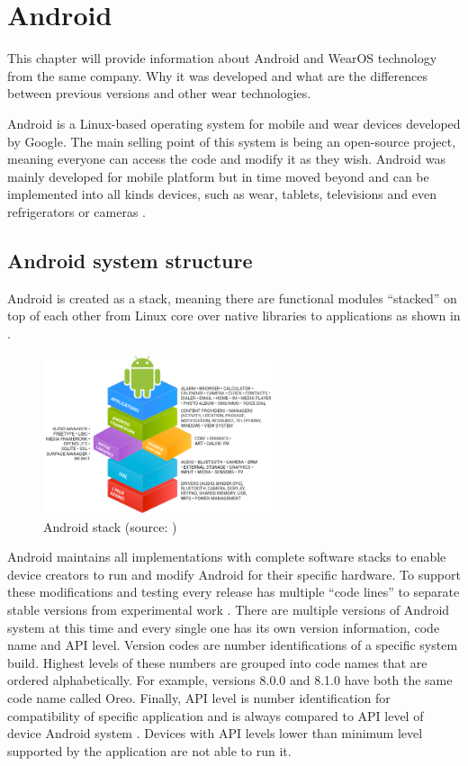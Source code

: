 \chapter{Android}\label{sec:Android}
This chapter will provide information about Android and WearOS technology from the same company. Why it was developed and what are the differences between previous versions and other wear technologies.

Android is a Linux-based operating system for mobile and wear devices developed by Google. The main selling point of this system is being an open-source project, meaning everyone can access the code and modify it as they wish. Android was mainly developed for mobile platform but in time moved beyond and can be implemented into all kinds devices, such as wear, tablets, televisions and even refrigerators or cameras \cite{WIGA}.

\section{Android system structure}\label{sec:AndroidSystemStructure}
Android is created as a stack, meaning there are functional modules \enquote{stacked} on top of each other from Linux core over native libraries to applications as shown in .

\begin{figure}[H]
	\begin{centering}
		\includegraphics[width=0.6\textwidth]{img/android_stack}
		\par\end{centering}
	\caption{Android stack (source: \cite{AOSP})\label{fig:AndroidStack}}
	\label{fig01c04}
\end{figure}

Android maintains all implementations with complete software stacks to enable device creators to run and modify Android for their specific hardware. To support these modifications and testing every release has multiple \enquote{code lines} to separate stable versions from experimental work \cite{AOSP}. There are multiple versions of Android system at this time and every single one has its own version information, code name and API level. Version codes are number identifications of a specific system build. Highest levels of these numbers are grouped into code names that are ordered alphabetically. For example, versions 8.0.0 and 8.1.0 have both the same code name called Oreo. Finally, API level is number identification for compatibility of specific application and is always compared to API level of device Android system \cite{AOSP, AD}. Devices with API levels lower than minimum level supported by the application are not able to run it.

